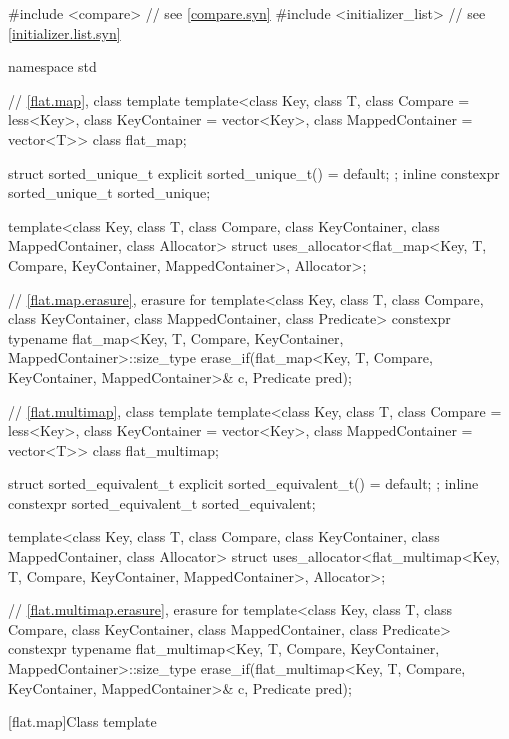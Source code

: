 %
\begin{codeblock}
#include <compare>              // see \ref{compare.syn}
#include <initializer_list>     // see \ref{initializer.list.syn}

namespace std {
  // \ref{flat.map}, class template 
  template<class Key, class T, class Compare = less<Key>,
           class KeyContainer = vector<Key>, class MappedContainer = vector<T>>
    class flat_map;

  struct sorted_unique_t { explicit sorted_unique_t() = default; };
  inline constexpr sorted_unique_t sorted_unique{};

  template<class Key, class T, class Compare, class KeyContainer, class MappedContainer,
           class Allocator>
    struct uses_allocator<flat_map<Key, T, Compare, KeyContainer, MappedContainer>,
                          Allocator>;

  // \ref{flat.map.erasure}, erasure for 
  template<class Key, class T, class Compare, class KeyContainer, class MappedContainer,
           class Predicate>
    constexpr typename flat_map<Key, T, Compare, KeyContainer, MappedContainer>::size_type
      erase_if(flat_map<Key, T, Compare, KeyContainer, MappedContainer>& c, Predicate pred);

  // \ref{flat.multimap}, class template 
  template<class Key, class T, class Compare = less<Key>,
           class KeyContainer = vector<Key>, class MappedContainer = vector<T>>
    class flat_multimap;

  struct sorted_equivalent_t { explicit sorted_equivalent_t() = default; };
  inline constexpr sorted_equivalent_t sorted_equivalent{};

  template<class Key, class T, class Compare, class KeyContainer, class MappedContainer,
           class Allocator>
    struct uses_allocator<flat_multimap<Key, T, Compare, KeyContainer, MappedContainer>,
                          Allocator>;

  // \ref{flat.multimap.erasure}, erasure for 
  template<class Key, class T, class Compare, class KeyContainer, class MappedContainer,
           class Predicate>
    constexpr typename flat_multimap<Key, T, Compare, KeyContainer, MappedContainer>::size_type
      erase_if(flat_multimap<Key, T, Compare, KeyContainer, MappedContainer>& c, Predicate pred);
}
\end{codeblock}

[flat.map]{Class template }


